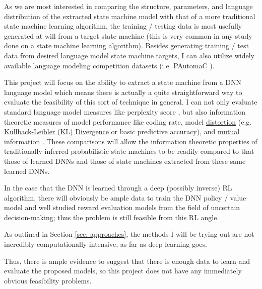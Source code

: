 As we are most interested in comparing the structure, parameters, and language distribution of the extracted state machine model with that of a more traditional state machine learning algorithm, the training / testing data is most usefully generated at will from a target state machine (this is very common in any study done on a state machine learning algorithm). Besides generating training / test data from desired language model state machine targets, I can also utilize widely available language modeling competition datasets (i.e. PAutomaC \cite{Verwer_PAutomaC}).

This project will focus on the ability to extract a state machine from a DNN language model which means there is actually a quite straightforward way to evaluate the feasibility of this sort of technique in general. I can not only evaluate standard language model measures like perplexity score \cite{Verwer_PAutomaC}, but also information theoretic measures of model performance like coding rate, model \href{https://weberna.github.io/jekyll/update/2017/11/08/Information-Bottleneck-Part1.html#fnref:3}{distortion} (e.g. \href{https://towardsdatascience.com/light-on-math-machine-learning-intuitive-guide-to-understanding-kl-divergence-2b382ca2b2a8}{Kullback-Leibler (KL) Divergence} or basic predictive accuracy), and \href{https://weberna.github.io/jekyll/update/2017/11/08/Information-Bottleneck-Part1.html#fnref:3}{mutual information} \cite{Marzen2019}. These comparisons will allow the information theoretic properties of traditionally inferred probabilistic state machines to be readily compared to that those of learned DNNs and those of state machines extracted from these same learned DNNs.

In the case that the DNN is learned through a deep (possibly inverse) RL algorithm, there will obviously be ample data to train the DNN policy / value model and well studied reward evaluation models from the field of uncertain decision-making; thus the problem is still feasible from this RL angle. 

As outlined in Section \ref{sec: approaches}, the methods I will be trying out are not incredibly computationally intensive, as far as deep learning goes.

Thus, there is ample evidence to suggest that there is enough data to learn and evaluate the proposed models, so this project does not have any immediately obvious feasibility problems.